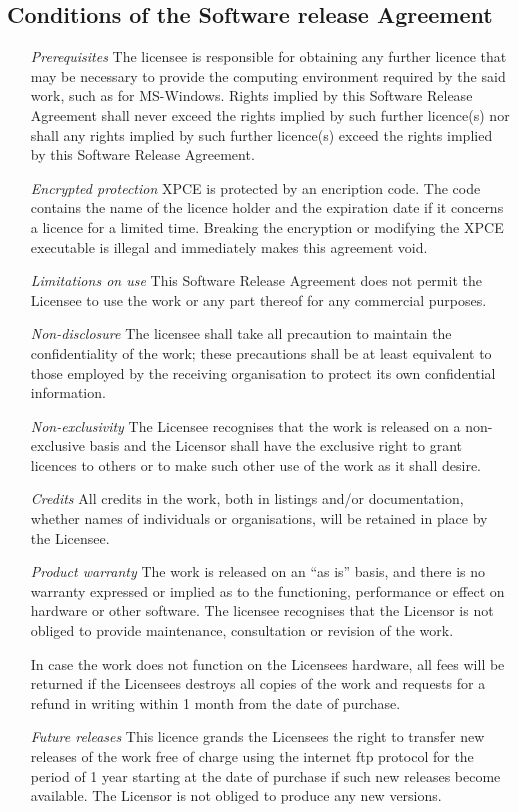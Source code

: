 \subsection*{Conditions of the Software release Agreement}

\begin{enumerate}
    \item[\it Prerequisites]
The licensee is responsible for obtaining any further licence that may
be necessary to provide the computing environment required by the said
work, such as for MS-Windows.  Rights implied by this Software Release
Agreement shall never exceed the rights implied by such further
licence(s) nor shall any rights implied by such further licence(s)
exceed the rights implied by this Software Release Agreement.
    \item[\it Encrypted protection]
XPCE is protected by an encription code. The code contains the name of
the licence holder and the expiration date if it concerns a licence for
a limited time. Breaking the encryption or modifying the XPCE executable
is illegal and immediately makes this agreement void.
    \item[\it Limitations on use]
This Software Release Agreement does not permit the Licensee to use the
work or any part thereof for any commercial purposes.
    \item[\it Non-disclosure]
The licensee shall take all precaution to maintain the confidentiality
of the work; these precautions shall be at least equivalent to those
employed by the receiving organisation to protect its own confidential
information. 
    \item[\it Non-exclusivity]
The Licensee recognises that the work is released on a non-exclusive
basis and the Licensor shall have the exclusive right to grant licences
to others or to make such other use of the work as it shall desire.
    \item[\it Credits]
All credits in the work, both in listings and/or documentation, whether
names of individuals or organisations, will be retained in place by the
Licensee.
    \item[\it Product warranty]
The work is released on an ``as is'' basis, and there is no warranty
expressed or implied as to the functioning, performance or effect on
hardware or other software. The licensee recognises that the Licensor
is not obliged to provide maintenance, consultation or revision of the
work.

In case the work does not function on the Licensees hardware, all fees
will be returned if the Licensees destroys all copies of the work and
requests for a refund in writing within 1 month from the date of
purchase.
    \item[\it Future releases]
This licence grands the Licensees the right to transfer new releases of
the work free of charge using the internet ftp protocol for the period
of 1 year starting at the date of purchase if such new releases become
available.  The Licensor is not obliged to produce any new versions.
\end{enumerate}



